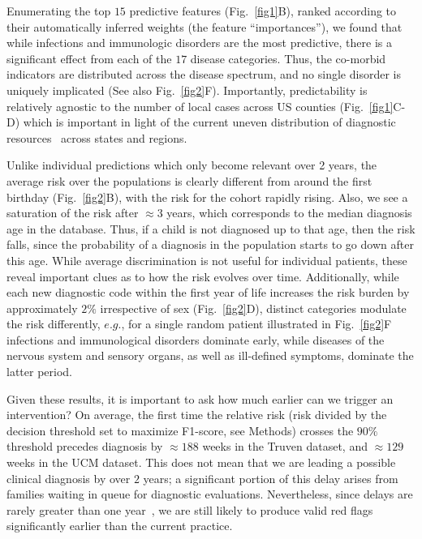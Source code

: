 \documentclass[onecolumn,10pt]{IEEEtran}
\begin{document}
Enumerating the top $15$ predictive features (Fig.~\ref{fig1}B), ranked  according to their automatically inferred weights  (the feature ``importances''), we found that while infections and immunologic disorders are the most predictive, there is a significant effect from each of  the $17$ disease categories. Thus, the  co-morbid indicators are  distributed across the disease spectrum, and no single  disorder is uniquely implicated (See also Fig.~\ref{fig2}F). Importantly, predictability is relatively agnostic to the number of local cases across US counties (Fig.~\ref{fig1}C-D) which is important in light of the current uneven distribution of  diagnostic resources~\cite{gordon2016whittling,althouse2006pediatric} across states and regions.
 
Unlike individual predictions which only become relevant over 2 years, the average risk over the populations is clearly different  from around the  first birthday (Fig.~\ref{fig2}B), with the risk for the  \treatment cohort rapidly rising. Also, we see a saturation of the risk after $\approx 3$ years, which corresponds to the median diagnosis age in the database. Thus, if a child is not diagnosed up to that age, then the  risk  falls, since the probability of a diagnosis in the population starts to go down after this age. While average discrimination is not useful for individual patients, these reveal important clues as to how the  risk evolves over time. Additionally, while  each  new diagnostic code within the first year of life  increases the risk burden by approximately $2\%$ irrespective of sex (Fig.~\ref{fig2}D), distinct  categories modulate the risk differently, $e.g.$, for a single random patient  illustrated in Fig.~\ref{fig2}F infections and immunological disorders dominate early, while  diseases of the nervous system and sensory organs, as well as ill-defined symptoms,  dominate the latter period.

Given these results, it is important to ask how much earlier can we trigger an intervention? On average,  the first time the relative risk (risk divided by the decision threshold set to maximize F1-score, see Methods) crosses the $90\%$ threshold precedes  diagnosis by  $\approx 188$ weeks in the Truven dataset, and $\approx 129$ weeks in the UCM dataset. This does not mean that we are   leading a possible clinical diagnosis by over $2$ years; a significant portion of this delay arises from families waiting in queue for diagnostic evaluations. Nevertheless, since delays are rarely greater than   one year~\cite{gordon2016whittling},  we are still likely to produce valid red flags significantly earlier than the current practice.
\end{document}
